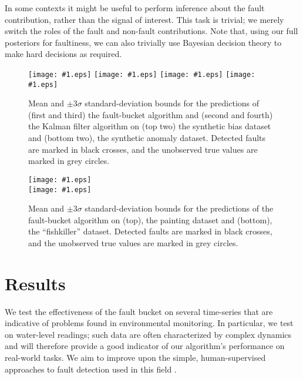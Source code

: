 \documentclass{article}
\newcommand{\psff}[1]{\texttt{[image: \#1.eps]}}
\begin{document}
In some contexts it might be useful to perform inference about the
fault contribution, rather than the signal of interest.  This task is
trivial; we merely switch the roles of the fault and non-fault
contributions. Note that, using our full posteriors for faultiness, we
can also trivially use Bayesian decision theory to make hard decisions
as required.

\begin{figure*}
  \centering
  \small
  \psff{bias}
  \psff{kf_bias}
  \vspace*{2\baselineskip}
  \psff{dynamics}
  \psff{kf_dynamics}
  \caption{Mean and $\pm3\sigma$ standard-deviation bounds for the
    predictions of (first and third) the fault-bucket algorithm and
    (second and fourth) the Kalman filter algorithm on (top two) the
    synthetic bias dataset and (bottom two), the synthetic anomaly
    dataset.  Detected faults are marked in black crosses, and the
    unobserved true values are marked in grey circles.}
  \label{compare}
\end{figure*}

\begin{figure*}
  \centering
  \small
  \psff{painting} \\
  \psff{fishkiller}
  \caption{Mean and $\pm3\sigma$ standard-deviation bounds for the
    predictions of the fault-bucket algorithm on (top), the painting
    dataset and (bottom), the ``fishkiller'' dataset.  Detected faults are
    marked in black crosses, and the unobserved true values are marked
    in grey circles.}
  \label{justfb}
\end{figure*}


\section{Results}
We test the effectiveness of the fault bucket on several time-series
that are indicative of problems found in environmental
monitoring. In particular, we test on water-level readings; such data
are often characterized by complex dynamics and will therefore provide
a good indicator of our algorithm's performance on real-world
tasks. We aim to improve upon the simple, human-supervised approaches
to fault detection used in this field
\citep{wagner2006guidelines}. 
\end{document}
